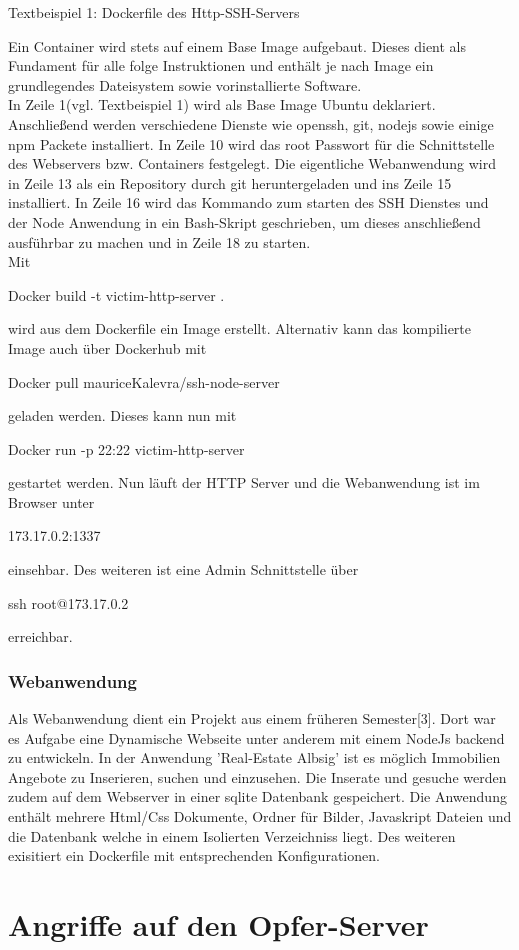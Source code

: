\documentclass[12pt]{article}
\begin{document}
\begin{center}
 Textbeispiel 1: Dockerfile des Http-SSH-Servers
\end{center}
Ein Container wird stets auf einem Base Image aufgebaut. Dieses dient als Fundament für alle folge Instruktionen und enthält je nach Image ein grundlegendes Dateisystem sowie vorinstallierte Software.\\
In Zeile 1(vgl. Textbeispiel 1) wird als Base Image Ubuntu deklariert. 
Anschließend werden verschiedene Dienste wie openssh, git, nodejs sowie einige npm Packete installiert.
In Zeile 10 wird das root Passwort für die Schnittstelle des Webservers bzw. Containers festgelegt. Die eigentliche Webanwendung wird in Zeile 13 als ein Repository durch git heruntergeladen und ins Zeile 15 installiert. In Zeile 16 wird das Kommando zum starten des SSH Dienstes und der Node Anwendung in ein Bash-Skript geschrieben, um dieses anschließend ausführbar zu machen und in Zeile 18 zu starten.\\
Mit \colorbox{mshadecolor}{\parbox{0.46\textwidth}{Docker build -t victim-http-server .}} wird aus dem Dockerfile ein Image erstellt. Alternativ kann das kompilierte Image auch über Dockerhub mit \colorbox{mshadecolor}{\parbox{0.58\textwidth}{Docker pull mauriceKalevra/ssh-node-server}} geladen werden. Dieses kann nun mit \colorbox{mshadecolor}{\parbox{0.51\textwidth}{Docker run -p 22:22 victim-http-server}} gestartet werden. Nun läuft der HTTP Server und die Webanwendung ist im Browser unter
\colorbox{mshadecolor}{\parbox{0.20\textwidth}{173.17.0.2:1337}} einsehbar. Des weiteren ist eine Admin Schnittstelle über \colorbox{mshadecolor}{\parbox{0.26\textwidth}{ssh root@173.17.0.2}} erreichbar.
\subsubsection{Webanwendung}
Als Webanwendung dient ein Projekt aus einem früheren Semester[3]. Dort war es Aufgabe eine Dynamische Webseite unter anderem mit einem NodeJs backend zu entwickeln. In der Anwendung 'Real-Estate Albsig' ist es möglich Immobilien Angebote zu Inserieren, suchen und einzusehen. Die Inserate und gesuche werden zudem auf dem Webserver in einer sqlite Datenbank gespeichert. Die Anwendung enthält mehrere Html/Css Dokumente, Ordner für Bilder, Javaskript Dateien und die Datenbank welche in einem Isolierten Verzeichniss liegt. Des weiteren exisitiert ein Dockerfile mit entsprechenden Konfigurationen.          
\newpage
\section{Angriffe auf den Opfer-Server}
\end{document}
